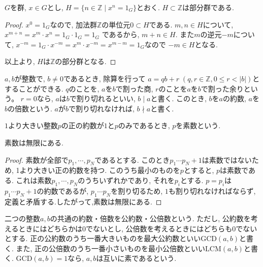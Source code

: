 \begin{tcolorbox}
	\begin{prp*}
		$G$を群, $x \in G$とし, 
		$ H = \{n \in \mathbb{Z} \mid x^n = 1_G \} $とおく.
		$ H \subset \mathbb{Z} $は部分群である.
	\end{prp*}
\end{tcolorbox}
\begin{proof}
  $x^0 = 1_G$なので, 加法群$\mathbb{Z}$の単位元$0 \subset H $である.
  $ m, n \in H$について, $ x^{m+n} = x^m\cdot x^n = 1_G\cdot 1_G =1_G $
  であるから, $m+n \in H $.
  また$m$の逆元$-m$について,
  $x^{-m} = 1_G\cdot x^{-m} = x^m\cdot x^{-m} = x^{m-m} = 1_G $なので
  $-m \in H$となる.

  以上より, $H$は$\mathbb{Z}$の部分群となる.
\end{proof}\leavevmode

$a,b$が整数で, $b \neq 0$であるとき, 除算を行って
$a=qb+r \; (q,r \in \mathbb{Z}, 0 \leq r < |b|)$とすることができる.
$q$のことを, $a$を$b$で割った商, $r$のことを$a$を$b$で割った余りという。
$r=0$なら, $a$は$b$で割り切れるといい, $b\mid a$と書く.
このとき, $b$を$a$の約数, $a$を$b$の倍数という.
$a$が$b$で割り切れなければ, $b \nmid a$と書く.\newline

$1$より大きい整数$p$の正の約数が$1$と$p$のみであるとき, $p$を素数という.

\begin{tcolorbox}
	\begin{thm*}
	  素数は無限にある.	
	\end{thm*}
\end{tcolorbox}
\begin{proof}
  素数が全部で$p_1,\cdots, p_N$であるとする.
  このとき$p_1\cdots p_N+1$は素数ではないため, 1より大きい正の約数を持つ.
  このうち最小のものを$p$とすると, $p$は素数である.
  これは素数$p_1,\cdots, p_N$のうちいずれかであり, それを$p_i$とする.
  $p=p_i$は$p_1\cdots p_N+1$の約数であるが, $p_1\cdots p_N$を割り切るため,
  $1$も割り切れなければならず, 定義と矛盾する.したがって,素数は無限にある.
\end{proof}

二つの整数$a,b$の共通の約数・倍数を公約数・公倍数という.
ただし, 公約数を考えるときにはどちらかは0でないとし,
公倍数を考えるときにはどちらも0でないとする.
正の公約数のうち一番大きいものを最大公約数といい$\mathrm{GCD}(a,b)$と書く.
また, 正の公倍数のうち一番小さいものを最小公倍数といい$\mathrm{LCM}(a,b)$と書く.
$\mathrm{GCD}(a,b)=1$なら, $a,b$は互いに素であるという.\newline

